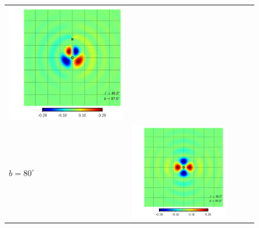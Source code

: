 \documentclass[a4paper,11pt]{article}
\begin{document}
\begin{figure}[t]
\begin{center}
\begin{tabular}{m{8ex}m{}m{}|m{}m{}}
\hspace{\kernelfigspace}\includegraphics[width=\kernelfigwidth]{qu2eb_iker_con_lat87_lon45.pdf} \\
$b=80^\circ$&
\hspace{\kernelfigspace}\includegraphics[width=\kernelfigwidth]{qu2eb_rker_rad_lat80_lon30.pdf} &

\end{tabular}
\end{center}
\end{figure}
\end{document}
